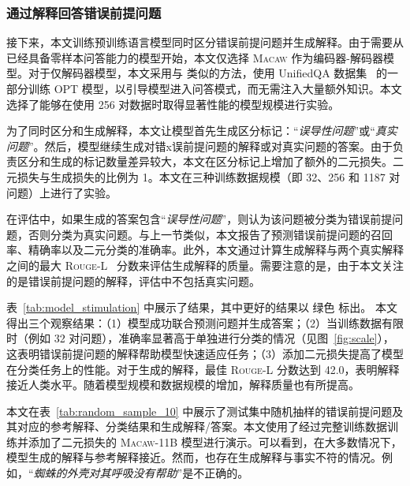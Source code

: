 \subsubsection{通过解释回答错误前提问题}
\label{exp:answerfpq}
接下来，本文训练预训练语言模型同时区分错误前提问题并生成解释。由于需要从已经具备零样本问答能力的模型开始，本文仅选择 \textsc{Macaw} 作为编码器-解码器模型。对于仅解码器模型，本文采用与 \citet{tafjord2021general} 类似的方法，使用 UnifiedQA 数据集~\cite{khashabi-etal-2020-unifiedqa} 的一部分训练 OPT 模型，以引导模型进入问答模式，而无需注入大量额外知识。本文选择了能够在使用 256 对数据时取得显著性能的模型规模进行实验。

为了同时区分和生成解释，本文让模型首先生成区分标记：“\textit{误导性问题}”或“\textit{真实问题}”。然后，模型继续生成对错x误前提问题的解释或对真实问题的答案。由于负责区分和生成的标记数量差异较大，本文在区分标记上增加了额外的二元损失。二元损失与生成损失的比例为 1。本文在三种训练数据规模（即 32、256 和 1187 对问题）上进行了实验。

在评估中，如果生成的答案包含“\textit{误导性问题}”，则认为该问题被分类为错误前提问题，否则分类为真实问题。与上一节类似，本文报告了预测错误前提问题的召回率、精确率以及二元分类的准确率。此外，本文通过计算生成解释与两个真实解释之间的最大 \textsc{Rouge}-L~\cite{lin2004rouge} 分数来评估生成解释的质量。需要注意的是，由于本文关注的是错误前提问题的解释，评估中不包括真实问题。

表~\ref{tab:model_stimulation} 中展示了结果，其中更好的结果以 \colorbox{emphcolor}{绿色} 标出。 本文得出三个观察结果：（1）模型成功联合预测问题并生成答案；（2）当训练数据有限时（例如 32 对问题），准确率显著高于单独进行分类的情况（见图~\ref{fig:scale}），这表明错误前提问题的解释帮助模型快速适应任务；（3）添加二元损失提高了模型在分类任务上的性能。对于生成的解释，最佳 \textsc{Rouge}-L 分数达到 42.0，表明解释接近人类水平。随着模型规模和数据规模的增加，解释质量也有所提高。

本文在表~\ref{tab:random_sample_10} 中展示了测试集中随机抽样的错误前提问题及其对应的参考解释、分类结果和生成解释/答案。本文使用了经过完整训练数据训练并添加了二元损失的 \textsc{Macaw-11B} 模型进行演示。可以看到，在大多数情况下，模型生成的解释与参考解释接近。然而，也存在生成解释与事实不符的情况。例如，“\textit{蜘蛛的外壳对其呼吸没有帮助}”是不正确的。

